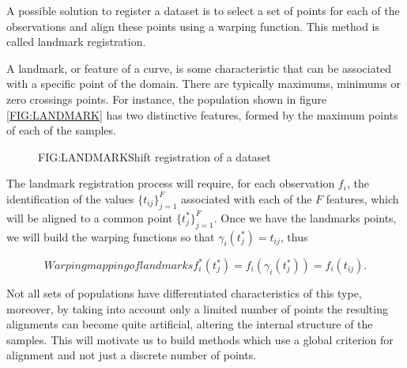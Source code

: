 A possible solution to register a dataset is to select a set of points for each
of the observations and align these points using a warping function. This method
 is called landmark registration.

A landmark, or feature of a curve, is some characteristic that can be
associated with a specific point of the domain. There are typically maximums, minimums or
zero crossings points. For instance, the population shown in figure
\ref{FIG:LANDMARK} has two distinctive features, formed by the maximum points of
 each of the samples.


\begin{figure}[Shift registration of a dataset]{FIG:LANDMARK}{Shift registration of a dataset}
   \quad
\end{figure}


The landmark registration process will require, for each observation $f_i$,
the identification of the values $\{t_{ij}\}_{j=1}^{F}$ associated with each of
the $F$ features, which will be aligned to a common point
$\{t_{j}^*\}_{j=1}^{F}$. Once we have the landmarks points, we will build the
 warping functions so that $\gamma_i(t_j^*)=t_{ij}$, thus

\begin{equation}[]{Warping mapping of landmarks}
f_i^*(t_j^*) = f_i(\gamma_i(t_j^*)) = f_i(t_{ij}).
\end{equation}

Not all sets of populations have differentiated characteristics of this type,
moreover, by taking into account only a limited number of points the resulting
alignments can become quite artificial, altering the internal structure of the
samples.
This will motivate us to build methods which use a global criterion for
alignment and not just a discrete number of points.
